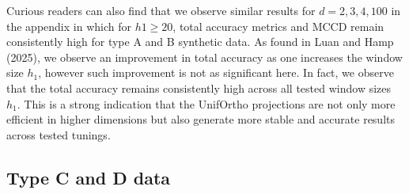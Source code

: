 \documentclass[12pt,a4paper]{report}
\begin{document}
Curious readers can also find that we observe similar results for $d=2,3,4, 100$ in the appendix in which for $h1 \geq 20$, total accuracy metrics and MCCD remain consistently high for type A and B synthetic data.
As found in Luan and Hamp (2025)\cite{LuanHamp2025}, we observe an improvement in total accuracy as one increases the window size $h_1$, however such improvement is not as significant here. In fact, we observe that the total accuracy remains consistently high across all tested window sizes $h_1$.
This is a strong indication that the UnifOrtho projections are not only more efficient in higher dimensions but also generate more stable and accurate results across tested tunings. 

\subsection{Type C and D data}
\end{document}
